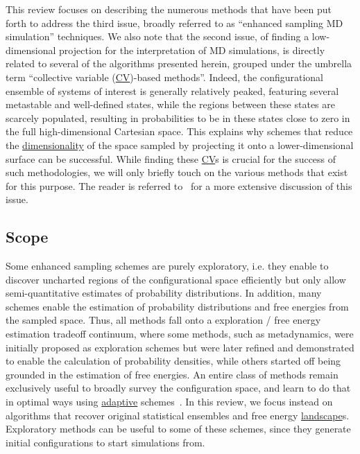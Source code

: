 \documentclass[9pt,review]{livecoms}
\begin{document}
This review focuses on describing the numerous methods that have been put forth to address the third issue, broadly referred to as ``enhanced sampling MD simulation'' techniques. We also note that the second issue, of finding a low-dimensional projection for the interpretation of MD simulations, is directly related to several of the algorithms presented herein, grouped under the umbrella term ``collective variable (\hyperlink{ref:CV} {CV})-based methods''. Indeed, the configurational ensemble of systems of interest is generally relatively peaked, featuring several metastable and well-defined states, while the regions between these states are scarcely populated, resulting in probabilities to be in these states close to zero in the full high-dimensional Cartesian space. This explains why schemes that reduce the \hyperlink{ref:DimRed} {dimensionality} of the space sampled by projecting it onto a lower-dimensional surface can be successful. While finding these \hyperlink{ref:CV} {CV}s is crucial for the success of such methodologies, we will only briefly touch on the various methods that exist for this purpose. The reader is referred to~\cite{WANG2020139, doi:10.1080/00268976.2020.1737742, doi:10.1021/acs.jctc.0c00355} for a more extensive discussion of this issue.



\subsection{Scope}

Some enhanced sampling schemes are purely exploratory, i.e. they enable to discover uncharted regions of the configurational space efficiently but only allow semi-quantitative estimates of probability distributions. In addition, many schemes enable the estimation of probability distributions and free energies from the sampled space. Thus, all methods fall onto a exploration / free energy estimation tradeoff continuum, where some methods, such as metadynamics, were initially proposed as exploration schemes but were later refined and demonstrated to enable the calculation of probability densities, while others started off being grounded in the estimation of free energies. An entire class of methods remain exclusively useful to broadly survey the configuration space, and learn to do that in optimal ways using \hyperlink{ref:Adaptive} {adaptive} schemes~\cite{ChiavazzoE5494}. In this review, we focus instead on algorithms that recover original statistical ensembles and free energy \hyperlink{ref:FES} {landscape}s. Exploratory methods can be useful to some of these schemes, since they generate initial configurations to start simulations from.
\end{document}
